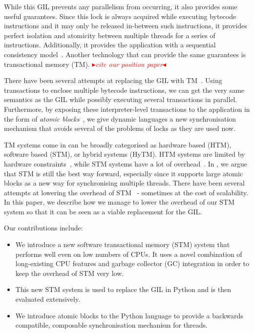 \documentclass{sigplanconf}
\newcommand{\mynote}[2]{%
  \textcolor{red}{%
    \fbox{\bfseries\sffamily\scriptsize#1}%
    {\small$\blacktriangleright$\textsf{\emph{#2}}$\blacktriangleleft$}%
  }%
}
\newcommand\remi[1]{\mynote{Remi}{#1}}
\begin{document}
While this GIL prevents any parallelism from occurring, it also
provides some useful guarantees. Since this lock is always acquired
while executing bytecode instructions and it may only be released
in-between such instructions, it provides perfect isolation and
atomicity between multiple threads for a series of
instructions. Additionally, it provides the application with a
sequential consistency model~\cite{lamport79}. Another technology that
can provide the same guarantees is transactional memory
(TM). \remi{cite our position paper}

There have been several attempts at replacing the GIL with
TM~\cite{nicholas06,odaira14,fuad10}. Using transactions to enclose
multiple bytecode instructions, we can get the very same semantics as
the GIL while possibly executing several transactions in
parallel. Furthermore, by exposing these interpreter-level
transactions to the application in the form of \emph{atomic
blocks}~\cite{tim03,tim05}, we give dynamic languages a new
synchronisation mechanism that avoids several of the problems of locks
as they are used now.

TM systems come in can be broadly categorised as hardware based (HTM),
software based (STM), or hybrid systems (HyTM). HTM systems are limited
by hardware constraints~\cite{odaira14,fuad10}, while STM systems have
a lot of overhead~\cite{cascaval08,drago11}. In \cite{wayforward14},
we argue that STM is still the best way forward, especially since it
supports large atomic blocks as a new way for synchronising multiple
threads. There have been several attempts at lowering the overhead
of STM~\cite{warmhoff13,spear09} - sometimes at the cost of scalability.
In this paper, we describe how we manage to lower the overhead of our
STM system so that it can be seen as a viable replacement for the GIL.

Our contributions include:
\begin{itemize}[noitemsep]
\item We introduce a new software transactional memory (STM) system
  that performs well even on low numbers of CPUs. It uses a novel
  combination of long-existing CPU features and garbage collector (GC)
  integration in order to keep the overhead of STM very low.
\item This new STM system is used to replace the GIL in Python and is
  then evaluated extensively.
\item We introduce atomic blocks to the Python language to provide a
  backwards compatible, composable synchronisation mechanism for
  threads.
\end{itemize}
\end{document}

